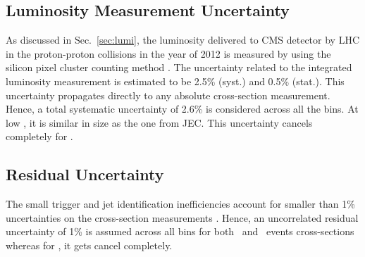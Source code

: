 \subsection{Luminosity Measurement Uncertainty}
As discussed in Sec.~\ref{sec:lumi}, the luminosity delivered to CMS detector by LHC in the proton-proton collisions in the year of 2012 is measured by using the silicon pixel cluster counting method \cite{CMS:2013gfa}. The uncertainty related to the integrated luminosity measurement is estimated to be 2.5\% (syst.) and 0.5\% (stat.). This uncertainty propagates directly to any absolute cross-section measurement. Hence, a total systematic uncertainty of 2.6\% is considered across all the \httwo bins. At low \httwons, it is similar in size as the one from JEC. This uncertainty cancels completely for \ratio.

\subsection{Residual Uncertainty}
The small trigger and jet identification inefficiencies account for smaller than 1\% uncertainties on the cross-section measurements \cite{Khachatryan:2016mlc,Chatrchyan:2012bja}. Hence, an uncorrelated residual uncertainty of 1\% is assumed across all \httwo bins for both \njt~and \njth~events cross-sections whereas for \rations, it gets cancel completely.

